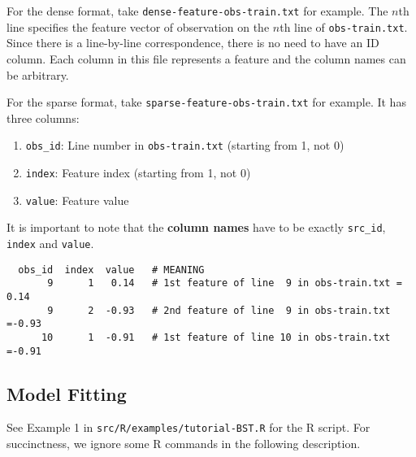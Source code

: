\documentclass[10pt]{article}
\begin{document}
For the dense format, take {\tt dense-feature-obs-train.txt} for example.  The $n$th line specifies the feature vector of observation on the $n$th line of {\tt obs-train.txt}.  Since there is a line-by-line correspondence, there is no need to have an ID column.  Each column in this file represents a feature and the column names can be arbitrary.

For the sparse format, take {\tt sparse-feature-obs-train.txt} for example.  It has three columns:
\begin{enumerate}
\item {\tt obs\_id}: Line number in {\tt obs-train.txt} (starting from 1, not 0)
\item {\tt index}: Feature index (starting from 1, not 0)
\item {\tt value}: Feature value
\end{enumerate}
It is important to note that the {\bf column names} have to be exactly {\tt src\_id}, {\tt index} and {\tt value}.
{\small\begin{verbatim}
  obs_id  index  value   # MEANING
       9      1   0.14   # 1st feature of line  9 in obs-train.txt = 0.14
       9      2  -0.93   # 2nd feature of line  9 in obs-train.txt =-0.93
      10      1  -0.91   # 1st feature of line 10 in obs-train.txt =-0.91
\end{verbatim}}

\subsection{Model Fitting}

See Example 1 in {\tt src/R/examples/tutorial-BST.R} for the R script.  For succinctness, we ignore some R commands in the following description.
\end{document}
